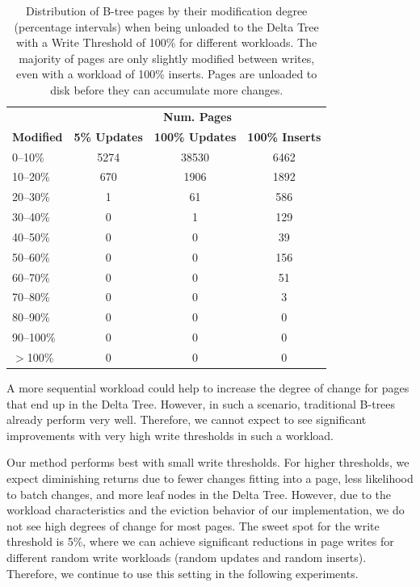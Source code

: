 \begin{table}[ht]
  \centering
    \begin{tabular}{l|ccc}
    \toprule
    & \multicolumn{3}{c}{\textbf{Num. Pages}} \\
    \cmidrule(lr){2-4}
    \textbf{Modified} & \textbf{5\% Updates} & \textbf{100\% Updates} & \textbf{100\% Inserts} \\
    \midrule
    0--10\%   & 5274 &  38530 &  6462 \\
    10--20\%  & 670 & 1906 &  1892 \\
    20--30\%  & 1 & 61 & 586 \\
    30--40\%  & 0 & 1 & 129\\
    40--50\%  & 0 & 0 & 39 \\
    50--60\%  & 0 & 0 & 156 \\
    60--70\%  & 0 & 0 & 51 \\
    70--80\%  & 0 & 0 & 3 \\
    80--90\%  & 0 & 0 & 0 \\
    90--100\% & 0 & 0 & 0 \\
    $>$100\% & 0 & 0 & 0 \\
    \bottomrule
  \end{tabular}
  \caption{Distribution of B-tree pages by their modification degree (percentage intervals) when being unloaded to the Delta Tree with a Write Threshold of 100\% for different workloads. The majority of pages are only slightly modified between writes, even with a workload of 100\% inserts. Pages are unloaded to disk before they can accumulate more changes.}
  \label{tab:modification-degree}
\end{table}

A more sequential workload could help to increase the degree of change for pages that end up in the Delta Tree.
However, in such a scenario, traditional B-trees already perform very well.
Therefore, we cannot expect to see significant improvements with very high write thresholds in such a workload.

Our method performs best with small write thresholds.
For higher thresholds, we expect diminishing returns due to fewer changes fitting into a page, less likelihood to batch changes, and more leaf nodes in the Delta Tree.
However, due to the workload characteristics and the eviction behavior of our implementation, we do not see high degrees of change for most pages.
The sweet spot for the write threshold is 5\%, where we can achieve significant reductions in page writes for different random write workloads (random updates and random inserts).
Therefore, we continue to use this setting in the following experiments.

